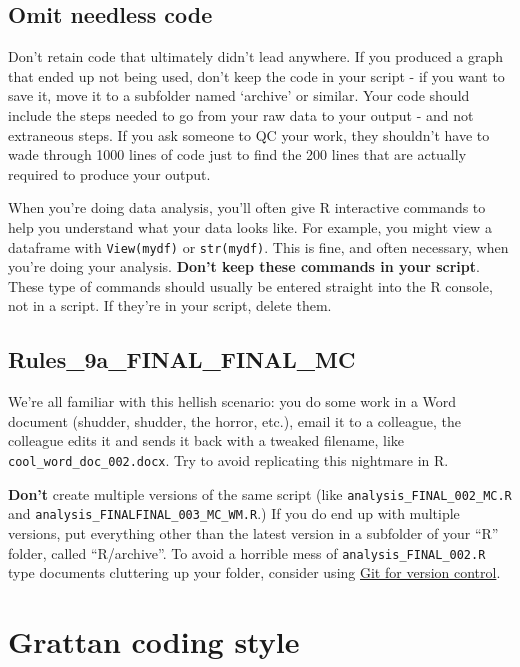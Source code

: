 \documentclass[]{book}
\begin{document}
\hypertarget{omit-needless-code}{%
\section{Omit needless code}\label{omit-needless-code}}

Don't retain code that ultimately didn't lead anywhere. If you produced a graph that ended up not being used, don't keep the code in your script - if you want to save it, move it to a subfolder named `archive' or similar. Your code should include the steps needed to go from your raw data to your output - and not extraneous steps. If you ask someone to QC your work, they shouldn't have to wade through 1000 lines of code just to find the 200 lines that are actually required to produce your output.

When you're doing data analysis, you'll often give R interactive commands to help you understand what your data looks like. For example, you might view a dataframe with \texttt{View(mydf)} or \texttt{str(mydf)}. This is fine, and often necessary, when you're doing your analysis. \textbf{Don't keep these commands in your script}. These type of commands should usually be entered straight into the R console, not in a script. If they're in your script, delete them.

\hypertarget{rules_9a_final_final_mc}{%
\section{Rules\_9a\_FINAL\_FINAL\_MC}\label{rules_9a_final_final_mc}}

We're all familiar with this hellish scenario: you do some work in a Word document (shudder, shudder, the horror, etc.), email it to a colleague, the colleague edits it and sends it back with a tweaked filename, like \texttt{cool\_word\_doc\_002.docx}. Try to avoid replicating this nightmare in R.

\textbf{Don't} create multiple versions of the same script (like \texttt{analysis\_FINAL\_002\_MC.R} and \texttt{analysis\_FINALFINAL\_003\_MC\_WM.R}.) If you do end up with multiple versions, put everything other than the latest version in a subfolder of your ``R'' folder, called ``R/archive''. To avoid a horrible mess of \texttt{analysis\_FINAL\_002.R} type documents cluttering up your folder, consider using \protect\hyperlink{version-control}{Git for version control}.

\hypertarget{coding-style}{%
\chapter{Grattan coding style}\label{coding-style}}
\end{document}
